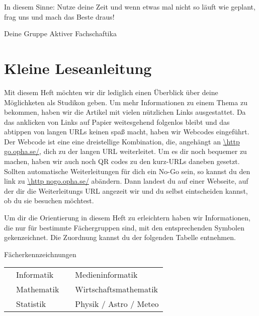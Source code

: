 In diesem Sinne: Nutze deine Zeit und wenn etwas mal nicht so läuft wie geplant, frag uns und mach das Beste draus!

Deine Gruppe Aktiver Fachschaftika

\chapter{Kleine Leseanleitung}

Mit diesem Heft möchten wir dir lediglich einen Überblick über deine Möglichketen als Studikon geben. Um mehr Informationen zu einem Thema zu bekommen, haben wir die Artikel mit vielen nützlichen Links ausgestattet. Da das anklicken von Links auf Papier weitesgehend folgenlos bleibt und das abtippen von langen URLs keinen spaß macht, haben wir Webcodes eingeführt. Der Webcode ist eine eine dreistellige Kombination, die, angehängt an \url{\http go.opha.se/}, dich zu der langen URL weiterleitet. Um es dir noch bequemer zu machen, haben wir auch noch QR codes zu den kurz-URLs daneben gesetzt. Sollten automatische Weiterleitungen für dich ein No-Go sein, so kannst du den link zu \url{\http nogo.opha.se/} abändern. Dann landest du auf einer Webseite, auf der dir die Weiterleitungs URL angezeit wir und du selbst eintscheiden kannst, ob du sie besuchen möchtest.

Um dir die Orientierung in diesem Heft zu erleichtern haben wir Informationen, die nur für bestimmte Fächergruppen sind, mit den entsprechenden Symbolen gekenzeichnet. Die Zuordnung kannst du der folgenden Tabelle entnehmen.

\begin{table*}[h]
	\centering
	Fächerkennzeichnungen
	\begin{tabular}{ l l l l }
		\subjectI & Informatik  & \subjectMI & Medieninformatik \\[1.5mm]
		\subjectM & Mathematik   & \subjectW  & Wirtschaftsmathematik \\[1.5mm]
		\subjectS & Statistik    & \subjectP  & Physik / Astro / Meteo
	\end{tabular}
\end{table*}